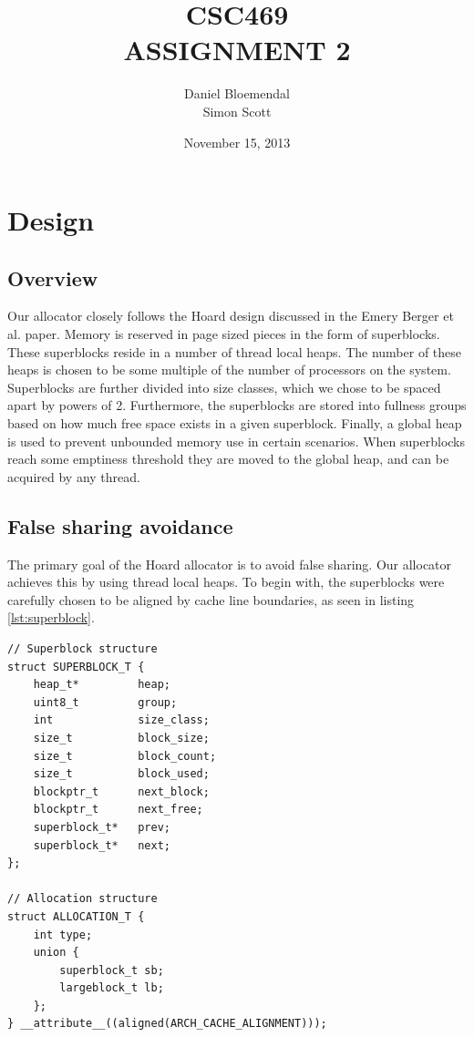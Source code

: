 \documentclass[oneside]{amsart}
\theoremstyle{definition}
\theoremstyle{remark}
\numberwithin{equation}{section}
\begin{document}
\title[CSC469 A2]{CSC469\\ASSIGNMENT 2}
\author{Daniel Bloemendal\\ Simon Scott}
\date{November 15, 2013}

\begin{titlepage}
\maketitle
\thispagestyle{empty}
\tableofcontents
\end{titlepage}

\section{Design}
\subsection{Overview}
Our allocator closely follows the Hoard design discussed in the Emery Berger et al. paper. Memory is reserved in page sized pieces in the form of superblocks. These superblocks reside in a number of thread local heaps. The number of these heaps is chosen to be some multiple of the number of processors on the system. Superblocks are further divided into size classes, which we chose to be spaced apart by powers of 2. Furthermore, the superblocks are stored into fullness groups based on how much free space exists in a given superblock. Finally, a global heap is used to prevent unbounded memory use in certain scenarios. When superblocks reach some emptiness threshold they are moved to the global heap, and can be acquired by any thread.

\subsection{False sharing avoidance}
The primary goal of the Hoard allocator is to avoid false sharing. Our allocator achieves this by using thread local heaps. To begin with, the superblocks were carefully chosen to be aligned by cache line boundaries, as seen in listing \ref{lst:superblock}.
\begin{lstlisting}
// Superblock structure
struct SUPERBLOCK_T {
    heap_t*         heap;
    uint8_t         group;
    int             size_class;
    size_t          block_size;
    size_t          block_count;
    size_t          block_used;
    blockptr_t      next_block;
    blockptr_t      next_free;
    superblock_t*   prev;
    superblock_t*   next;
};

// Allocation structure
struct ALLOCATION_T {
    int type;
    union {
        superblock_t sb;
        largeblock_t lb;
    };
} __attribute__((aligned(ARCH_CACHE_ALIGNMENT)));
\end{lstlisting}
\end{document}
